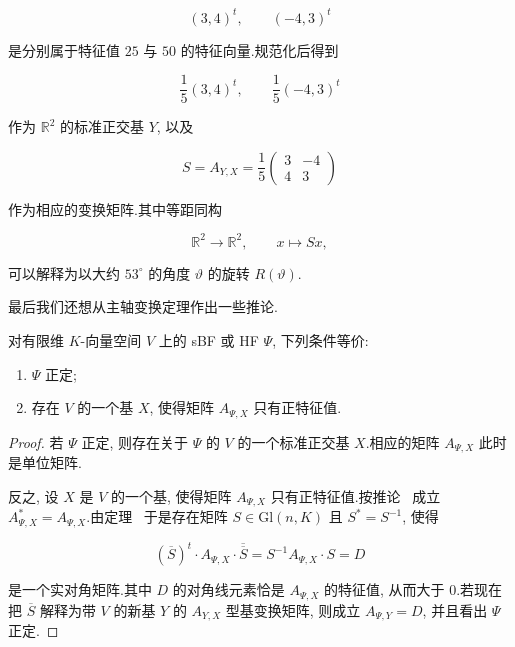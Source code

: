 \[
(3, 4)^t, \qquad (-4, 3)^t
\]

是分别属于特征值 $25$ 与 $50$ 的特征向量.规范化后得到

\[
\frac{1}{5}(3, 4)^t, \qquad \frac{1}{5}(-4, 3)^t
\]

作为 $\mathbb{R}^2$ 的标准正交基 $Y$, 以及

\[
S = A_{Y, X} = \frac{1}{5} \begin{pmatrix} 3 & -4 \\ 4 & 3 \end{pmatrix}
\]

作为相应的变换矩阵.其中等距同构

\[
\mathbb{R}^2 \longrightarrow \mathbb{R}^2, \qquad x \longmapsto S x,
\]

可以解释为以大约 $53^{\circ}$ 的角度 $\vartheta$ 的旋转 $R(\vartheta)$.

最后我们还想从主轴变换定理作出一些推论.

\begin{corollary}\label{cor:7.6.8}
对有限维 $K$-向量空间 $V$ 上的 sBF 或 HF $\Psi$, 下列条件等价:
\begin{enumerate}
\item[(i)] $\Psi$ 正定;
\item[(ii)] 存在 $V$ 的一个基 $X$, 使得矩阵 $A_{\varPsi, X}$ 只有正特征值.
\end{enumerate}
\end{corollary}

\begin{proof}
若 $\Psi$ 正定, 则存在关于 $\Psi$ 的 $V$ 的一个标准正交基 $X$.相应的矩阵 $A_{\varPsi, X}$ 此时是单位矩阵.

反之, 设 $X$ 是 $V$ 的一个基, 使得矩阵 $A_{\varPsi, X}$ 只有正特征值.按推论~ 成立 $A_{\varPsi, X}^* = A_{\varPsi, X}$.由定理~ 于是存在矩阵 $S \in \mathrm{Gl}(n, K)$ 且 $S^* = S^{-1}$, 使得

\[
(\overline{S})^t \cdot A_{\varPsi, X} \cdot \overline{\overline{S}} = S^{-1} A_{\varPsi, X} \cdot S = D
\]

是一个实对角矩阵.其中 $D$ 的对角线元素恰是 $A_{\varPsi, X}$ 的特征值, 从而大于 $0$.若现在把 $\overline{S}$ 解释为带 $V$ 的新基 $Y$ 的 $A_{Y, X}$ 型基变换矩阵, 则成立 $A_{\varPsi, Y} = D$, 并且看出 $\Psi$ 正定.
\end{proof}

